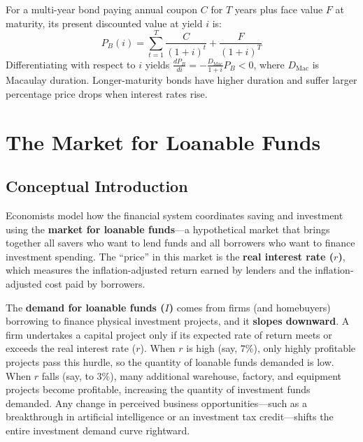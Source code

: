 \documentclass[11pt,letterpaper]{article}
\begin{document}
\begin{coreprinciple}
For a multi-year bond paying annual coupon $C$ for $T$ years plus face value $F$ at maturity, its present discounted value at yield $i$ is:
$$P_B(i) = \sum_{t=1}^{T} \frac{C}{(1+i)^t} + \frac{F}{(1+i)^T}$$
Differentiating with respect to $i$ yields $\frac{dP_B}{di} = -\frac{D_{\text{Mac}}}{1+i} P_B < 0$, where $D_{\text{Mac}}$ is Macaulay duration. Longer-maturity bonds have higher duration and suffer larger percentage price drops when interest rates rise.
\end{coreprinciple}

\section{The Market for Loanable Funds}

\subsection*{Conceptual Introduction}
Economists model how the financial system coordinates saving and investment using the \textbf{market for loanable funds}—a hypothetical market that brings together all savers who want to lend funds and all borrowers who want to finance investment spending. The ``price'' in this market is the \textbf{real interest rate ($r$)}, which measures the inflation-adjusted return earned by lenders and the inflation-adjusted cost paid by borrowers.

The \textbf{demand for loanable funds ($I$)} comes from firms (and homebuyers) borrowing to finance physical investment projects, and it \textbf{slopes downward}. A firm undertakes a capital project only if its expected rate of return meets or exceeds the real interest rate ($r$). When $r$ is high (say, $7\%$), only highly profitable projects pass this hurdle, so the quantity of loanable funds demanded is low. When $r$ falls (say, to $3\%$), many additional warehouse, factory, and equipment projects become profitable, increasing the quantity of investment funds demanded. Any change in perceived business opportunities—such as a breakthrough in artificial intelligence or an investment tax credit—shifts the entire investment demand curve rightward.
\end{document}
